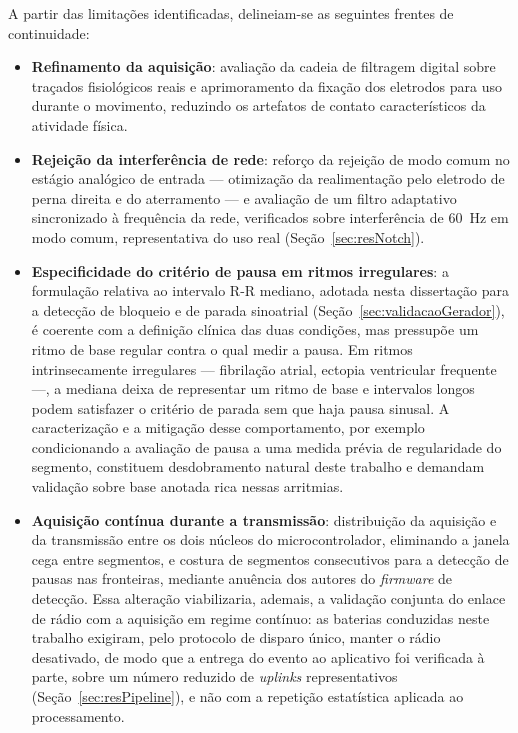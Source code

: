 A partir das limitações identificadas, delineiam-se as seguintes frentes de continuidade:

\begin{itemize}
    \item \textbf{Refinamento da aquisição}: avaliação da cadeia de filtragem digital sobre traçados fisiológicos reais e aprimoramento da fixação dos eletrodos para uso durante o movimento, reduzindo os artefatos de contato característicos da atividade física.

    \item \textbf{Rejeição da interferência de rede}: reforço da rejeição de modo comum no estágio analógico de entrada — otimização da realimentação pelo eletrodo de perna direita e do aterramento — e avaliação de um filtro adaptativo sincronizado à frequência da rede, verificados sobre interferência de 60~Hz em modo comum, representativa do uso real (Seção~\ref{sec:resNotch}).

    \item \textbf{Especificidade do critério de pausa em ritmos irregulares}: a formulação relativa ao intervalo R-R mediano, adotada nesta dissertação para a detecção de bloqueio e de parada sinoatrial (Seção~\ref{sec:validacaoGerador}), é coerente com a definição clínica das duas condições, mas pressupõe um ritmo de base regular contra o qual medir a pausa. Em ritmos intrinsecamente irregulares — fibrilação atrial, ectopia ventricular frequente —, a mediana deixa de representar um ritmo de base e intervalos longos podem satisfazer o critério de parada sem que haja pausa sinusal. A caracterização e a mitigação desse comportamento, por exemplo condicionando a avaliação de pausa a uma medida prévia de regularidade do segmento, constituem desdobramento natural deste trabalho e demandam validação sobre base anotada rica nessas arritmias.

    \item \textbf{Aquisição contínua durante a transmissão}: distribuição da aquisição e da transmissão entre os dois núcleos do microcontrolador, eliminando a janela cega entre segmentos, e costura de segmentos consecutivos para a detecção de pausas nas fronteiras, mediante anuência dos autores do \textit{firmware} de detecção. Essa alteração viabilizaria, ademais, a validação conjunta do enlace de rádio com a aquisição em regime contínuo: as baterias conduzidas neste trabalho exigiram, pelo protocolo de disparo único, manter o rádio desativado, de modo que a entrega do evento ao aplicativo foi verificada à parte, sobre um número reduzido de \textit{uplinks} representativos (Seção~\ref{sec:resPipeline}), e não com a repetição estatística aplicada ao processamento.


\end{itemize}

